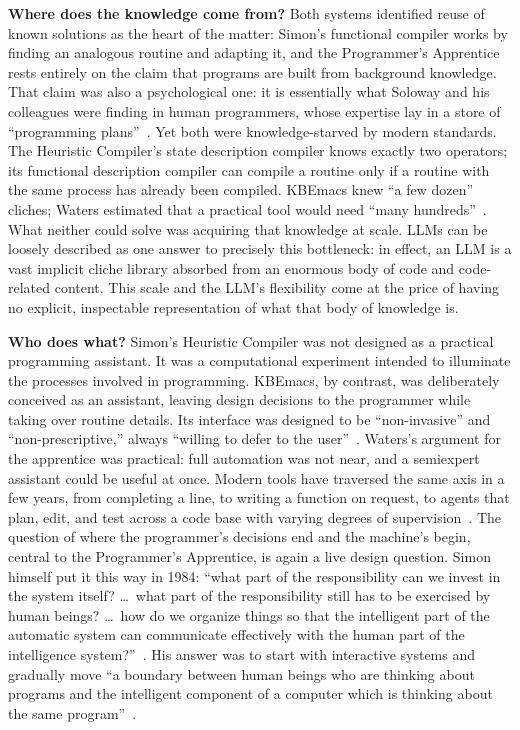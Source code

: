 \documentclass[11pt]{article}
\begin{document}
\textbf{Where does the knowledge come from?} Both systems identified
reuse of known solutions as the heart of the matter: Simon's
functional compiler works by finding an analogous routine and adapting
it, and the Programmer's Apprentice rests entirely on the claim that
programs are built from background knowledge. That claim was also a
psychological one: it is essentially what Soloway and his colleagues
were finding in human programmers, whose expertise lay in a store of
``programming plans''~\cite{soloway1984}. Yet both were
knowledge-starved by modern standards. The Heuristic Compiler's state
description compiler knows exactly two operators; its functional
description compiler can compile a routine only if a routine with the
same process has already been compiled. KBEmacs knew ``a few dozen''
cliches; Waters estimated that a practical tool would need ``many
hundreds''~\cite[p.~55]{waters1986aimag}. What neither could solve was
acquiring that knowledge at scale. LLMs can be loosely described as
one answer to precisely this bottleneck: in effect, an LLM is a
vast implicit cliche library absorbed from an enormous body of
code and code-related content. This scale and the LLM's flexibility
come at the price of having no explicit, inspectable representation
of what that body of knowledge is.

\textbf{Who does what?} Simon's Heuristic Compiler was not designed as
a practical programming assistant. It was a computational experiment
intended to illuminate the processes involved in programming. KBEmacs,
by contrast, was deliberately conceived as an assistant, leaving
design decisions to the programmer while taking over routine details.
Its interface was designed to be ``non-invasive'' and
``non-prescriptive,'' always ``willing to defer to the
user''~\cite{pitman1983wp244}.
Waters's argument for the apprentice was practical: full automation
was not near, and a semiexpert assistant could be useful at
once. Modern tools have traversed the same axis in a few years, from
completing a line, to writing a function on request, to agents that
plan, edit, and test across a code base with varying degrees of
supervision~\cite{yang2024sweagent,jimenez2024swebench}. The question
of where the programmer's decisions end and the machine's begin,
central to the Programmer's Apprentice, is again a live design
question. Simon himself put it this way in 1984: ``what part of the
responsibility can we invest in the system itself? \ldots\ what part
of the responsibility still has to be exercised by human beings?
\ldots\ how do we organize things so that the intelligent part of the
automatic system can communicate effectively with the human part of
the intelligence system?''~\cite[p.~727]{simon1986}. His answer was to start with
interactive systems and gradually move ``a boundary between human
beings who are thinking about programs and the intelligent component
of a computer which is thinking about the same
program''~\cite[p.~730]{simon1986}.
\end{document}
